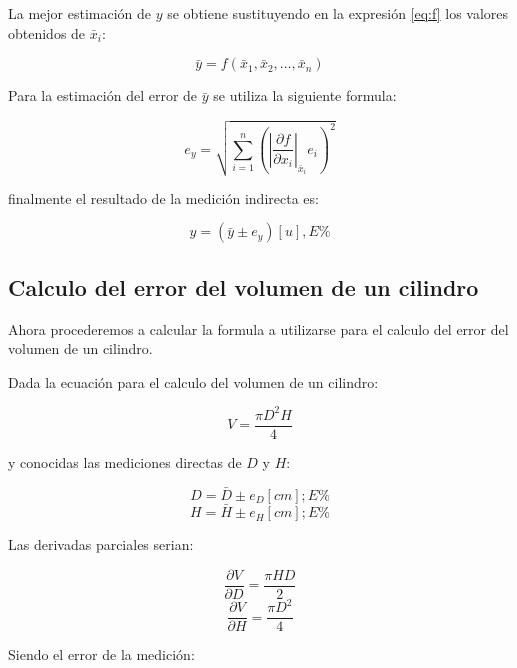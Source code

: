 \documentclass[letter,twoside,11pt]{article}
\begin{document}
La mejor estimación de $y$ se obtiene sustituyendo en la expresión \ref{eq:f}
los valores obtenidos de $\bar{x}_i$:

\begin{equation}
    \bar{y} = f(\bar{x}_1,\bar{x}_2,\dots,\bar{x}_n)
\end{equation}

Para la estimación del error de $\bar{y}$ se utiliza la siguiente formula:

\begin{equation}
    e_y = \sqrt{\sum_{i=1}^{n}
    \left(\left|\frac{\partial{f}}{\partial{x_i}}\right|_{\bar{x}_i}
    e_i\right)^2}
\end{equation}

finalmente el resultado de la medición indirecta es:

\begin{equation}
    y = (\bar{y} \pm e_y)[u], E\%
\end{equation}

\subsection{Calculo del error del volumen de un cilindro}
Ahora procederemos a calcular la formula a utilizarse para el calculo del
error del volumen de un cilindro.

Dada la ecuación para el calculo del volumen de un cilindro:

\begin{equation}
    V = \frac{\pi D^2 H}{4}
\end{equation}

y conocidas las mediciones directas de $D$ y $H$:

\begin{equation}
    D = \bar{D} \pm e_D [cm]; E\%
\end{equation}
\begin{equation}
    H = \bar{H} \pm e_H [cm]; E\%
\end{equation}

Las derivadas parciales serian:

\begin{equation}
    \frac{\partial{V}}{\partial{D}} = \frac{\pi H D}{2}
\end{equation}
\begin{equation}
    \frac{\partial{V}}{\partial{H}} = \frac{\pi D^2}{4}
\end{equation}

Siendo el error de la medición:
\end{document}
